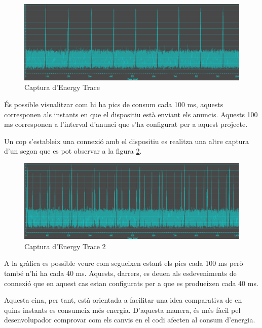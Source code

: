 \begin{figure}[!h]
	\begin{center}
		\includegraphics[width=\textwidth]{./images/energy_trace.png}
		\caption{Captura d'Energy Trace}
		\label{energy_trace1}
	\end{center}
\end{figure}

És possible visualitzar com hi ha pics de consum cada 100 ms, aquests corresponen als instants en que el dispositiu està enviant els anuncis.
Aquests 100 ms corresponen a l'interval d'anunci que s'ha configurat per a aquest projecte.

Un cop s'estableix una connexió amb el dispositiu es realitza una altre captura d'un segon que es pot observar a la figura \ref{energy_trace2}.

\begin{figure}[!h]
	\begin{center}
		\includegraphics[width=\textwidth]{./images/energy_trace_2.png}
		\caption{Captura d'Energy Trace 2}
		\label{energy_trace2}
	\end{center}
\end{figure}

A la gràfica es possible veure com segueixen estant els pics cada 100 ms però també n'hi ha cada 40 ms.
Aquests, darrers, es deuen als esdeveniments de connexió que en aquest cas estan configurats per a que es produeixen cada 40 ms.

Aquesta eina, per tant, està orientada a facilitar una idea comparativa de en quins instants es consumeix més energia.
D'aquesta manera, és més fàcil pel desenvolupador comprovar com els canvis en el codi afecten al consum d'energia.

